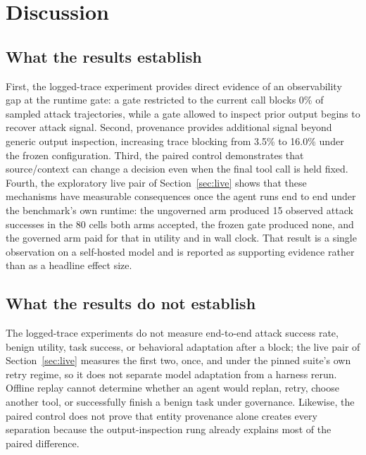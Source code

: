 \documentclass[letterpaper,twocolumn,10pt]{article}
\begin{document}
\section{Discussion}
\label{sec:discussion}

\subsection{What the results establish}
\label{sec:disc:establish}

First, the logged-trace experiment provides direct evidence of an observability
gap at the runtime gate: a gate restricted to the current call blocks 0\% of
sampled attack trajectories, while a gate allowed to inspect prior output begins
to recover attack signal. Second, provenance provides additional signal beyond
generic output inspection, increasing trace blocking from 3.5\% to 16.0\% under
the frozen configuration. Third, the paired control demonstrates that
source/context can change a decision even when the final tool call is held
fixed. Fourth, the exploratory live pair of Section~\ref{sec:live} shows that
these mechanisms have measurable consequences once the agent runs end to end
under the benchmark's own runtime: the ungoverned arm produced 15 observed attack
successes in the 80 cells both arms accepted, the frozen gate produced none, and
the governed arm paid for that in utility and in wall clock. That result is a
single observation on a self-hosted model and is reported as supporting evidence
rather than as a headline effect size.

\subsection{What the results do not establish}
\label{sec:disc:notestablish}

The logged-trace experiments do not measure end-to-end attack success rate,
benign utility, task success, or behavioral adaptation after a block; the live
pair of Section~\ref{sec:live} measures the first two, once, and under the pinned
suite's own retry regime, so it does not separate model adaptation from a harness
rerun. Offline replay cannot
determine whether an agent would replan, retry, choose another tool, or
successfully finish a benign task under governance. Likewise, the paired control
does not prove that entity provenance alone creates every separation because the
output-inspection rung already explains most of the paired difference.
\end{document}
